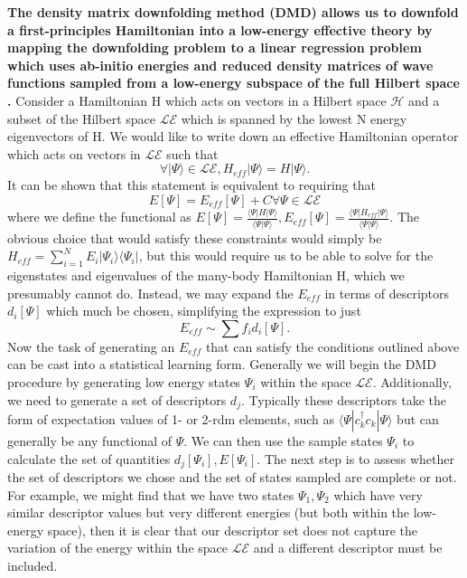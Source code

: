 \documentclass{article}
\begin{document}
\textbf{The density matrix downfolding method (DMD) allows us to downfold a first-principles Hamiltonian into a low-energy effective theory by mapping the downfolding problem to a linear regression problem which uses ab-initio energies and reduced density matrices of wave functions sampled from a low-energy subspace of the full Hilbert space \cite{10.3389/fphy.2018.00043}. }
Consider a Hamiltonian H which acts on vectors in a Hilbert space $\mathcal{H}$ and a subset of the Hilbert space $\mathcal{LE}$ which is spanned by the lowest N energy eigenvectors of H. 
We would like to write down an effective Hamiltonian operator which acts on vectors in $\mathcal{LE}$ such that  $$\forall |\Psi\rangle \in \mathcal{LE}, H_{eff}|\Psi \rangle = H|\Psi \rangle.$$ 
It can be shown that this statement is equivalent to requiring that $$ E[\Psi] = E_{eff}[\Psi] + C \forall \Psi \in \mathcal{LE}$$ where we define the functional as $E[\Psi] = \frac{\langle \Psi | H | \Psi \rangle}{\langle \Psi | \Psi \rangle},E_{eff}[\Psi] = \frac{\langle \Psi | H_{eff} | \Psi \rangle}{\langle \Psi | \Psi \rangle}$. 
The obvious choice that would satisfy these constraints would simply be $H_{eff} = \sum_{i=1}^{N} E_i |\Psi_i\rangle \langle \Psi_i|$, but this would require us to be able to solve for the eigenstates and eigenvalues of the many-body Hamiltonian H, which we presumably cannot do. 
Instead, we may expand the $E_{eff}$ in terms of descriptors $d_i[\Psi]$ which much be chosen, simplifying the expression to just 
\begin{equation}
E_{eff} \sim \sum f_i d_i[\Psi].
\end{equation}
Now the task of generating an $E_{eff}$ that can satisfy the conditions outlined above can be cast into a statistical learning form.
Generally we will begin the DMD procedure by generating low energy states $\Psi_i$ within the space $\mathcal{LE}$. 
Additionally, we need to generate a set of descriptors $d_j$. 
Typically these descriptors take the form of expectation values of 1- or 2-rdm elements, such as $\langle \Psi| c^\dagger_k c_k |\Psi \rangle$ but can generally be any functional of $\Psi$. 
We can then use the sample states $\Psi_i$ to calculate the set of quantities $d_j[\Psi_i], E[\Psi_i]$. 
The next step is to assess whether the set of descriptors we chose and the set of states sampled are complete or not. 
For example, we might find that we have two states $\Psi_1, \Psi_2$ which have very similar descriptor values but very different energies (but both within the low-energy space), then it is clear that our descriptor set does not capture the variation of the energy within the space $\mathcal{LE}$ and a different descriptor must be included. 
\end{document}
